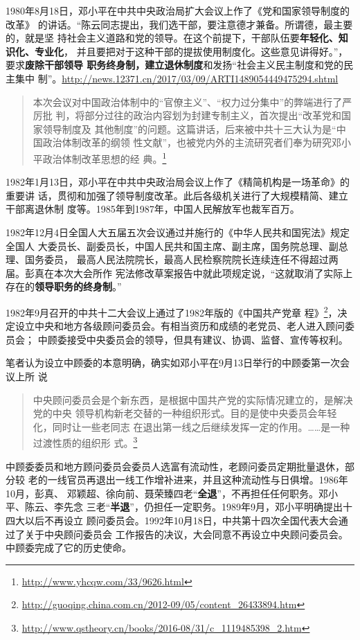 1980年8月18日，邓小平在中共中央政治局扩大会议上作了《党和国家领导制度的改革》
的讲话。“陈云同志提出，我们选干部，要注意德才兼备。所谓德，最主要的，就是坚
持社会主义道路和党的领导。在这个前提下，干部队伍要\textbf{年轻化、知识化、专业化}，
并且要把对于这种干部的提拔使用制度化。这些意见讲得好。”，要求\textbf{废除干部领导
  职务终身制，建立退休制度}和发扬“社会主义民主制度和党的民主集中
制”。\url{http://news.12371.cn/2017/03/09/ARTI1489054449475294.shtml}
\begin{quotation}
  本次会议对中国政治体制中的“官僚主义”、“权力过分集中”的弊端进行了严厉批
  判，将部分过往的政治内容划为封建专制主义，首次提出“改革党和国家领导制度及
  其他制度”的问题。这篇讲话，后来被中共十三大认为是“中国政治体制改革的纲领
  性文献”，也被党内外的主流研究者们奉为研究邓小平政治体制改革思想的经
  典。\footnote{\url{http://www.yhcqw.com/33/9626.html}}
\end{quotation}

1982年1月13日，邓小平在中共中央政治局会议上作了《精简机构是一场革命》的重要讲
话，贯彻和加强了领导制度改革。此后各级机关进行了大规模精简、建立干部离退休制
度等。1985年到1987年，中国人民解放军也裁军百万。

1982年12月4日全国人大五届五次会议通过并施行的《中华人民共和国宪法》规定全国人
大委员长、副委员长，中国人民共和国主席、副主席，国务院总理、副总理、国务委员，
最高人民法院院长，最高人民检察院院长连续连任不得超过两届。彭真在本次大会所作
宪法修改草案报告中就此项规定说，“这就取消了实际上存在的\textbf{领导职务的终身制}。”


1982年9月召开的中共十二大会议上通过了1982年版的《中国共产党章
程》\footnote{\url{http://guoqing.china.com.cn/2012-09/05/content_26433894.htm}}，决
定设立中央和地方各级顾问委员会。有相当资历和成绩的老党员、老人进入顾问委员会；
中顾委接受中央委员会的领导，但具有建议、协调、监督、宣传等权利。

笔者认为设立中顾委的本意明确，确实如邓小平在9月13日举行的中顾委第一次会议上所
说
\begin{quotation}
  中央顾问委员会是个新东西，是根据中国共产党的实际情况建立的，是解决党的中央
  领导机构新老交替的一种组织形式。目的是使中央委员会年轻化，同时让一些老同志
  在退出第一线之后继续发挥一定的作用。……是一种过渡性质的组织形
  式。\footnote{\url{http://www.qstheory.cn/books/2016-08/31/c_1119485398_2.htm}}
\end{quotation}

中顾委委员和地方顾问委员会委员人选富有流动性，老顾问委员定期批量退休，部分较
老的一线官员再退出一线工作增补进来，并且这种流动性与日俱增。1986年10月，彭真、
邓颖超、徐向前、聂荣臻四老“\textbf{全退}”，不再担任任何职务。邓小平、陈云、李先念
三老“\textbf{半退}”，仍担任一定职务。1989年9月，邓小平明确提出十四大以后不再设立
顾问委员会。1992年10月18日，中共第十四次全国代表大会通过了关于中央顾问委员会
工作报告的决议，大会同意不再设立中央顾问委员会。中顾委完成了它的历史使命。

